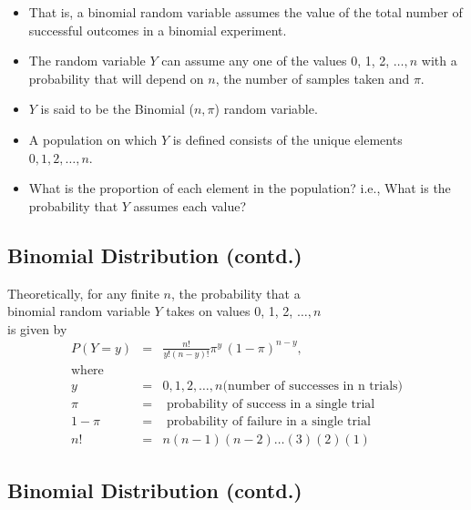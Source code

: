 \documentclass[
  letterpaper,
  DIV=11,
  numbers=noendperiod]{scrartcl}
\begin{document}
\begin{itemize}
\item
  That is, a {binomial random variable} assumes the value of the total
  number of successful outcomes in a binomial experiment.\\
\item
  The random variable \(Y\) can assume any one of the values 0, 1, 2,
  \(\ldots, n\) with a probability that will depend on \(n\), the number
  of samples taken and \(\pi\).\\
\item
  \(Y\) is said to be the Binomial (\(n,\pi\)) random variable.\\
\item
  A population on which \(Y\) is defined consists of the unique elements
  \(0,1,2,\ldots,n\).\\
\item
  What is the proportion of each element in the population? i.e., What
  is the probability that \(Y\) assumes each value?
\end{itemize}

\subsection{Binomial Distribution
(contd.)}\label{binomial-distribution-contd.-2}

Theoretically, for any finite \(n\), the probability that a\\
{binomial random variable} \(Y\) takes on values 0, 1, 2, \(\dots, n\)\\
is given by\\
\[\begin{eqnarray*}
P(Y=y) & = & \frac{n!}{y!(n-y)!}\pi^y\,(1 - \pi)^{n-y}, \\
\mbox{where} & & \\
        y & = & 0, 1, 2, \ldots, n \mbox {(number of successes in n trials)}\\
\pi & = &  \mbox{ probability of success in a single trial}\\
1-\pi & = &  \mbox{ probability of failure in a single trial}\\
n! & = & n(n-1)(n-2) \ldots (3)(2)(1)
\end{eqnarray*}\]

\subsection{Binomial Distribution
(contd.)}\label{binomial-distribution-contd.-3}
\end{document}
